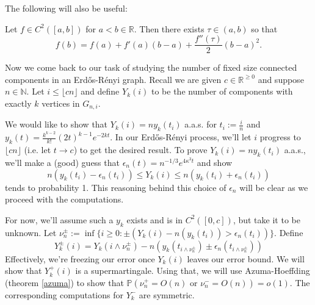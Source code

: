 The following will also be useful:

\begin{theorem}
    \label{taylor}
    Let \(f \in C^{2}([a, b])\) for \(a < b \in \mathbb{R}\). Then there exists \(\tau \in (a, b)\) so that
    \[f(b) = f(a) + f'(a)(b-a) + \frac{f''(\tau)}{2}(b-a)^{2}.\]
\end{theorem}

Now we come back to our task of studying the number of fixed size connected components in an Erdős-Rényi graph. Recall we are given \(c \in
\mathbb{R}^{\geq 0}\) and suppose \(n \in \mathbb{N}\). Let \(i \leq \lfloor {cn} \rfloor\) and define \(Y_{k}(i)\) to be the number of components with exactly \(k\) vertices in \(G_{n, i}\).

We would like to show that \(Y_{k}(i) = n y_{k}(t_{i})\) a.a.s. for \(t_{i} := \frac{i}{n}\) and \(y_{k}(t) = \frac{k^{k-2}}{k!}(2t)^{k-1} e^{-2kt}\). In our Erdős-Rényi process, we'll let \(i\) progress to \(\lfloor {cn} \rfloor\) (i.e. let \(t \to c\)) to get the desired result. To prove \(Y_{k}(i) = n y_{k}(t_{i})\) a.a.s., we'll make a (good) guess that \(\epsilon_{n}(t) = n^{-1/3} e^{4 \kappa^{3} t}\) and show
\[n(y_{k}(t_{i}) - \epsilon_{n}(t_{i})) \leq Y_{k}(i) \leq n(y_{k}(t_{i}) + \epsilon_{n}(t_{i}))\]
tends to probability 1. This reasoning behind this choice of \(\epsilon_{n}\) will be clear as we proceed with the computations.

For now, we'll assume such a \(y_{k}\) exists and is in \(C^{2}([0, c])\), but take it to be unknown. Let \(\nu_{n}^{\pm} := \inf\limits \{i \geq 0 : \pm (Y_{k}(i) - n(y_{k}(t_{i})) > \epsilon_{n}(t_{i}))\}\). Define
\[Y_{k}^{\pm}(i) = Y_{k}(i \wedge \nu_{n}^{\pm}) - n(y_{k}(t_{i \wedge \nu_{n}^{\pm}}) \pm \epsilon_{n}(t_{i \wedge \nu_{n}^{\pm}})) \]
Effectively, we're freezing our error once \(Y_{k}(i)\) leaves our error bound. We will show that \(Y_{k}^{+}(i)\) is a supermartingale. Using that, we will use Azuma-Hoeffding (theorem \ref{azuma}) to show that \(\mathbb{P}(\nu_{n}^{+} = O(n) \text{ or } \nu_{n}^{-} = O(n)) = o(1)\). The corresponding computations for \(Y_{k}^{-}\) are symmetric.

